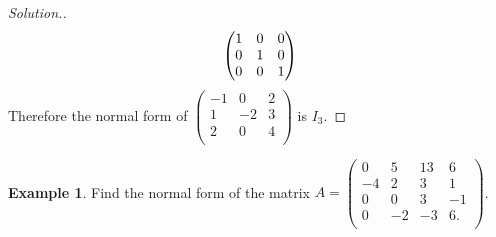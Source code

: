 \documentclass[11pt,a4paper]{article}
\theoremstyle{definition}
\newtheorem{exa}[thm]{Example}
\newenvironment{solution}
  {\renewcommand{\qedsymbol}{}\begin{proof}[\textit{Solution}.]}
  {\end{proof}}
\begin{document}
\begin{solution}
\begin{align*}
\begin{matrix}
\end{matrix}
\hspace{0.3cm}
\begin{pmatrix}
1&0&0\\0&1&0\\0&0&1\\
\end{pmatrix}\\
\end{align*}
Therefore the normal form of $
\begin{pmatrix}
-1&0&2\\1&-2&3\\2&0&4\\
\end{pmatrix}
$ is $I_3$.
\end{solution}


\begin{exa}
Find the normal form of the matrix $A=
\begin{pmatrix}
0&5&13&6\\-4&2&3&1\\0&0&3&-1\\0&-2&-3&6.\\
\end{pmatrix}
$.
\end{exa}
\end{document}
